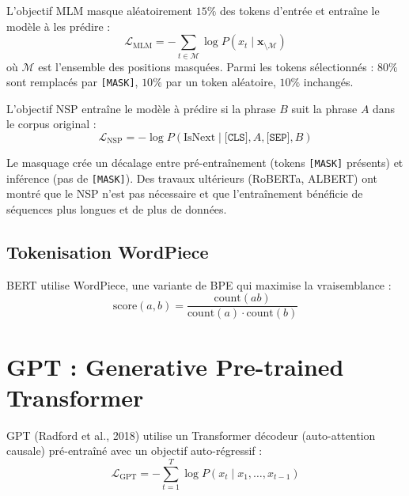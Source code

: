\begin{definition}
L'objectif MLM masque al\'eatoirement $15\%$ des tokens d'entr\'ee et
entra\^ine le mod\`ele \`a les pr\'edire :
\[
\mathcal{L}_{\text{MLM}} = -\sum_{t \in \mathcal{M}} \log P(x_t \mid \mathbf{x}_{\setminus \mathcal{M}})
\]
o\`u $\mathcal{M}$ est l'ensemble des positions masqu\'ees. Parmi les tokens
s\'electionn\'es : $80\%$ sont remplac\'es par \texttt{[MASK]}, $10\%$ par un
token al\'eatoire, $10\%$ inchang\'es.
\end{definition}

\begin{definition}
L'objectif NSP entra\^ine le mod\`ele \`a pr\'edire si la phrase $B$ suit
la phrase $A$ dans le corpus original :
\[
\mathcal{L}_{\text{NSP}} = -\log P(\text{IsNext} \mid \texttt{[CLS]}, A, \texttt{[SEP]}, B)
\]
\end{definition}

\begin{attention}[title=\textbf{Limites du MLM}]
Le masquage cr\'ee un d\'ecalage entre pr\'e-entra\^inement (tokens
\texttt{[MASK]} pr\'esents) et inf\'erence (pas de \texttt{[MASK]}). Des
travaux ult\'erieurs (RoBERTa, ALBERT) ont montr\'e que le NSP n'est pas
n\'ecessaire et que l'entra\^inement b\'en\'eficie de s\'equences plus longues
et de plus de donn\'ees.
\end{attention}

\subsection{Tokenisation WordPiece}

BERT utilise WordPiece, une variante de BPE qui maximise la vraisemblance :
\[
\text{score}(a, b) = \frac{\text{count}(ab)}{\text{count}(a) \cdot \text{count}(b)}
\]

\section{GPT : Generative Pre-trained Transformer}
\label{sec:pre:gpt}

\begin{definition}[GPT]
GPT (Radford et al., 2018) utilise un Transformer d\'ecodeur (auto-attention
causale) pr\'e-entra\^in\'e avec un objectif auto-r\'egressif :
\[
\mathcal{L}_{\text{GPT}} = -\sum_{t=1}^{T} \log P(x_t \mid x_1, \ldots, x_{t-1})
\]
\end{definition}

